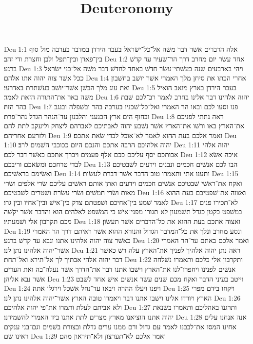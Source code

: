 

\title{Deuteronomy}

Deu 1:1  אלה הדברים אשׁר דבר משׁה אל־כל־ישׂראל בעבר הירדן במדבר בערבה מול סוף בין־פארן ובין־תפל ולבן וחצרת ודי זהב׃
Deu 1:2  אחד עשׂר יום מחרב דרך הר־שׂעיר עד קדשׁ ברנע׃
Deu 1:3  ויהי בארבעים שׁנה בעשׁתי־עשׂר חדשׁ באחד לחדשׁ דבר משׁה אל־בני ישׂראל ככל אשׁר צוה יהוה אתו אלהם׃
Deu 1:4  אחרי הכתו את סיחן מלך האמרי אשׁר יושׁב בחשׁבון ואת עוג מלך הבשׁן אשׁר־יושׁב בעשׁתרת באדרעי׃
Deu 1:5  בעבר הירדן בארץ מואב הואיל משׁה באר את־התורה הזאת לאמר׃
Deu 1:6  יהוה אלהינו דבר אלינו בחרב לאמר רב־לכם שׁבת בהר הזה׃
Deu 1:7  פנו וסעו לכם ובאו הר האמרי ואל־כל־שׁכניו בערבה בהר ובשׁפלה ובנגב ובחוף הים ארץ הכנעני והלבנון עד־הנהר הגדל נהר־פרת׃
Deu 1:8  ראה נתתי לפניכם את־הארץ באו ורשׁו את־הארץ אשׁר נשׁבע יהוה לאבתיכם לאברהם ליצחק וליעקב לתת להם ולזרעם אחריהם׃
Deu 1:9  ואמר אלכם בעת ההוא לאמר לא־אוכל לבדי שׂאת אתכם׃
Deu 1:10  יהוה אלהיכם הרבה אתכם והנכם היום ככוכבי השׁמים לרב׃
Deu 1:11  יהוה אלהי אבותכם יסף עליכם ככם אלף פעמים ויברך אתכם כאשׁר דבר לכם׃
Deu 1:12  איכה אשׂא לבדי טרחכם ומשׂאכם וריבכם׃
Deu 1:13  הבו לכם אנשׁים חכמים ונבנים וידעים לשׁבטיכם ואשׂימם בראשׁיכם׃
Deu 1:14  ותענו אתי ותאמרו טוב־הדבר אשׁר־דברת לעשׂות׃
Deu 1:15  ואקח את־ראשׁי שׁבטיכם אנשׁים חכמים וידעים ואתן אותם ראשׁים עליכם שׂרי אלפים ושׂרי מאות ושׂרי חמשׁים ושׂרי עשׂרת ושׁטרים לשׁבטיכם׃
Deu 1:16  ואצוה את־שׁפטיכם בעת ההוא לאמר שׁמע בין־אחיכם ושׁפטתם צדק בין־אישׁ ובין־אחיו ובין גרו׃
Deu 1:17  לא־תכירו פנים במשׁפט כקטן כגדל תשׁמעון לא תגורו מפני־אישׁ כי המשׁפט לאלהים הוא והדבר אשׁר יקשׁה מכם תקרבון אלי ושׁמעתיו׃
Deu 1:18  ואצוה אתכם בעת ההוא את כל־הדברים אשׁר תעשׂון׃
Deu 1:19  ונסע מחרב ונלך את כל־המדבר הגדול והנורא ההוא אשׁר ראיתם דרך הר האמרי כאשׁר צוה יהוה אלהינו אתנו ונבא עד קדשׁ ברנע׃
Deu 1:20  ואמר אלכם באתם עד־הר האמרי אשׁר־יהוה אלהינו נתן לנו׃
Deu 1:21  ראה נתן יהוה אלהיך לפניך את־הארץ עלה רשׁ כאשׁר דבר יהוה אלהי אבתיך לך אל־תירא ואל־תחת׃
Deu 1:22  ותקרבון אלי כלכם ותאמרו נשׁלחה אנשׁים לפנינו ויחפרו־לנו את־הארץ וישׁבו אתנו דבר את־הדרך אשׁר נעלה־בה ואת הערים אשׁר נבא אליהן׃
Deu 1:23  וייטב בעיני הדבר ואקח מכם שׁנים עשׂר אנשׁים אישׁ אחד לשׁבט׃
Deu 1:24  ויפנו ויעלו ההרה ויבאו עד־נחל אשׁכל וירגלו אתה׃
Deu 1:25  ויקחו בידם מפרי הארץ ויורדו אלינו וישׁבו אתנו דבר ויאמרו טובה הארץ אשׁר־יהוה אלהינו נתן לנו׃
Deu 1:26  ולא אביתם לעלת ותמרו את־פי יהוה אלהיכם׃
Deu 1:27  ותרגנו באהליכם ותאמרו בשׂנאת יהוה אתנו הוציאנו מארץ מצרים לתת אתנו ביד האמרי להשׁמידנו׃
Deu 1:28  אנה אנחנו עלים אחינו המסו את־לבבנו לאמר עם גדול ורם ממנו ערים גדלת ובצורת בשׁמים וגם־בני ענקים ראינו שׁם׃
Deu 1:29  ואמר אלכם לא־תערצון ולא־תיראון מהם׃
